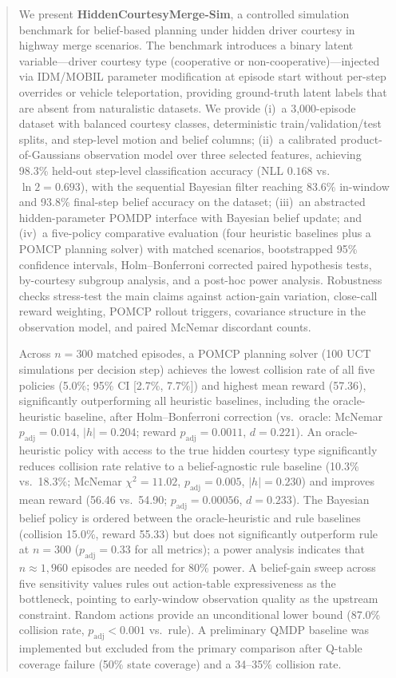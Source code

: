 \begin{abstract}
We present \textbf{HiddenCourtesyMerge-Sim}, a controlled simulation
benchmark for belief-based planning under hidden driver courtesy in
highway merge scenarios.
The benchmark introduces a binary latent variable---driver courtesy type
(cooperative or non-cooperative)---injected via IDM/MOBIL parameter
modification at episode start without per-step overrides or vehicle
teleportation, providing ground-truth latent labels that are absent from
naturalistic datasets.
We provide (i)~a 3{,}000-episode dataset with balanced courtesy classes,
deterministic train/validation/test splits, and step-level motion and belief
columns; (ii)~a calibrated product-of-Gaussians observation model over three
selected features, achieving 98.3\% held-out step-level classification
accuracy (NLL $0.168$ vs.\ $\ln 2{=}0.693$), with the sequential Bayesian
filter reaching 83.6\% in-window and 93.8\% final-step belief accuracy on
the dataset; (iii)~an abstracted hidden-parameter POMDP interface with
Bayesian belief update; and (iv)~a five-policy comparative evaluation
(four heuristic baselines plus a POMCP planning solver) with matched scenarios,
bootstrapped 95\% confidence intervals, Holm--Bonferroni corrected paired
hypothesis tests, by-courtesy subgroup analysis, and a post-hoc power analysis.
Robustness checks stress-test the main claims against action-gain variation,
close-call reward weighting, POMCP rollout triggers, covariance structure in
the observation model, and paired McNemar discordant counts.

Across $n{=}300$ matched episodes, a POMCP planning solver (100 UCT
simulations per decision step) achieves the lowest collision rate of all
five policies (5.0\%; 95\% CI [2.7\%, 7.7\%]) and highest mean reward
(57.36), significantly outperforming all heuristic baselines, including the
oracle-heuristic baseline, after Holm--Bonferroni correction
(vs.\ oracle: McNemar $p_\text{adj}{=}0.014$, $|h|{=}0.204$;
reward $p_\text{adj}{=}0.0011$, $d{=}0.221$).
An oracle-heuristic policy with access to the true hidden courtesy type
significantly reduces collision rate relative to a belief-agnostic rule baseline
(10.3\% vs.\ 18.3\%; McNemar $\chi^2{=}11.02$, $p_\text{adj}{=}0.005$,
$|h|{=}0.230$) and improves mean reward (56.46 vs.\ 54.90;
$p_\text{adj}{=}0.00056$, $d{=}0.233$).
The Bayesian belief policy is ordered between the oracle-heuristic and rule
baselines (collision 15.0\%, reward 55.33) but does not significantly
outperform rule at $n{=}300$ ($p_\text{adj}{=}0.33$ for all metrics);
a power analysis indicates that $n{\approx}1{,}960$ episodes are needed for
80\% power.
A belief-gain sweep across five sensitivity values rules out
action-table expressiveness as the bottleneck, pointing to
early-window observation quality as the upstream constraint.
Random actions provide an unconditional lower bound
(87.0\% collision rate, $p_\text{adj}{<}0.001$ vs.\ rule).
A preliminary QMDP baseline was implemented but excluded from the primary
comparison after Q-table coverage failure (50\% state coverage) and a
34--35\% collision rate.


\end{abstract}
